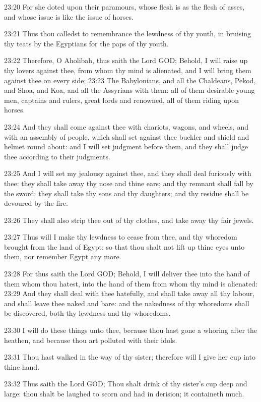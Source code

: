 23:20 For she doted upon their paramours, whose flesh is as the flesh of asses, and whose issue is like the issue of horses.

23:21 Thus thou calledst to remembrance the lewdness of thy youth, in bruising thy teats by the Egyptians for the paps of thy youth.

23:22 Therefore, O Aholibah, thus saith the Lord GOD; Behold, I will raise up thy lovers against thee, from whom thy mind is alienated, and I will bring them against thee on every side; 23:23 The Babylonians, and all the Chaldeans, Pekod, and Shoa, and Koa, and all the Assyrians with them: all of them desirable young men, captains and rulers, great lords and renowned, all of them riding upon horses.

23:24 And they shall come against thee with chariots, wagons, and wheels, and with an assembly of people, which shall set against thee buckler and shield and helmet round about: and I will set judgment before them, and they shall judge thee according to their judgments.

23:25 And I will set my jealousy against thee, and they shall deal furiously with thee: they shall take away thy nose and thine ears; and thy remnant shall fall by the sword: they shall take thy sons and thy daughters; and thy residue shall be devoured by the fire.

23:26 They shall also strip thee out of thy clothes, and take away thy fair jewels.

23:27 Thus will I make thy lewdness to cease from thee, and thy whoredom brought from the land of Egypt: so that thou shalt not lift up thine eyes unto them, nor remember Egypt any more.

23:28 For thus saith the Lord GOD; Behold, I will deliver thee into the hand of them whom thou hatest, into the hand of them from whom thy mind is alienated: 23:29 And they shall deal with thee hatefully, and shall take away all thy labour, and shall leave thee naked and bare: and the nakedness of thy whoredoms shall be discovered, both thy lewdness and thy whoredoms.

23:30 I will do these things unto thee, because thou hast gone a whoring after the heathen, and because thou art polluted with their idols.

23:31 Thou hast walked in the way of thy sister; therefore will I give her cup into thine hand.

23:32 Thus saith the Lord GOD; Thou shalt drink of thy sister's cup deep and large: thou shalt be laughed to scorn and had in derision; it containeth much.

